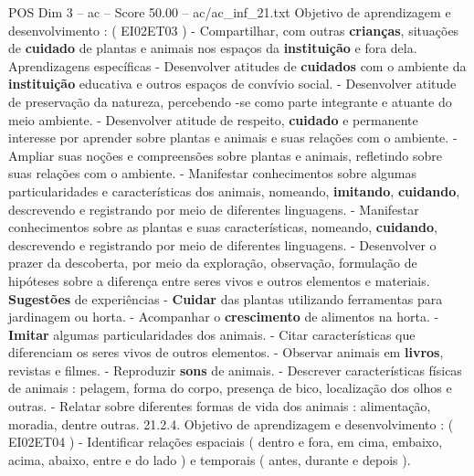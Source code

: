 \begin{textsample}{POS Dim 3 – ac – Score 50.00 – ac/ac\_inf\_21.txt}
Objetivo de aprendizagem e desenvolvimento : ( EI02ET03 ) - Compartilhar, com outras \textbf{crianças}, situações de \textbf{cuidado} de plantas e animais nos espaços da \textbf{instituição} e fora dela.
Aprendizagens específicas - Desenvolver atitudes de \textbf{cuidados} com o ambiente da \textbf{instituição} educativa e outros espaços de convívio social. - Desenvolver atitude de preservação da natureza, percebendo -se como parte integrante e atuante do meio ambiente. - Desenvolver atitude de respeito, \textbf{cuidado} e permanente interesse por aprender sobre plantas e animais e suas relações com o ambiente. - Ampliar suas noções e compreensões sobre plantas e animais, refletindo sobre suas relações com o ambiente. - Manifestar conhecimentos sobre algumas particularidades e características dos animais, nomeando, \textbf{imitando}, \textbf{cuidando}, descrevendo e registrando por meio de diferentes linguagens. - Manifestar conhecimentos sobre as plantas e suas características, nomeando, \textbf{cuidando}, descrevendo e registrando por meio de diferentes linguagens. - Desenvolver o prazer da descoberta, por meio da exploração, observação, formulação de hipóteses sobre a diferença entre seres vivos e outros elementos e materiais. \textbf{Sugestões} de experiências - \textbf{Cuidar} das plantas utilizando ferramentas para jardinagem ou horta. - Acompanhar o \textbf{crescimento} de alimentos na horta. - \textbf{Imitar} algumas particularidades dos animais. - Citar características que diferenciam os seres vivos de outros elementos. - Observar animais em \textbf{livros}, revistas e filmes. - Reproduzir \textbf{sons} de animais. - Descrever características físicas de animais : pelagem, forma do corpo, presença de bico, localização dos olhos e outras. - Relatar sobre diferentes formas de vida dos animais : alimentação, moradia, dentre outras. 21.2.4.
Objetivo de aprendizagem e desenvolvimento : ( EI02ET04 ) - Identificar relações espaciais ( dentro e fora, em cima, embaixo, acima, abaixo, entre e do lado ) e temporais ( antes, durante e depois ).

\end{textsample}
